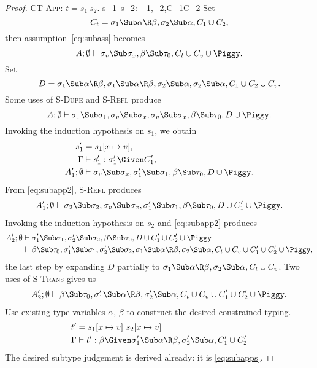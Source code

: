\documentclass{amsart}
\theoremstyle{definition}
\begin{document}
\begin{proof}
\Case\textsc{CT-App}: $t=s_1~s_2$.
{\Gamma\vdash s_1~s_2:\beta\Given
\sigma_1\Sub\alpha\R\beta,\sigma_2\Sub\alpha,C_1\cup C_2
}
Set
\[
C_t=\sigma_1\Sub\alpha\R\beta,\sigma_2\Sub\alpha,C_1\cup C_2,
\]
then assumption~\eqref{eq:subass} becomes
\[
A;\emptyset\vdash
  \sigma_v\Sub\sigma_x,
  \beta\Sub\tau_0,
  C_t\cup C_v\cup\Piggy.
\]
Set
\[
D=
\sigma_1\Sub\alpha\R\beta,
\sigma_1\Sub\alpha\R\beta,
\sigma_2\Sub\alpha,
\sigma_2\Sub\alpha,C_1\cup C_2\cup C_v.
\]
Some uses of \textsc{S-Dupe} and \textsc{S-Refl} produce
\[
A;\emptyset\vdash
  \sigma_1\Sub\sigma_1,
  \sigma_v\Sub\sigma_x,\sigma_v\Sub\sigma_x,
  \beta\Sub\tau_0,
  D\cup\Piggy.
\]
Invoking the induction hypothesis on $s_1$, we obtain
\begin{align}
s_1'&=s_1[x\mapsto v]\notag,
\\
\Gamma&\vdash s_1' : \sigma_1' \Given C_1',
\label{eq:subapp1}
\\
A_1';\emptyset&\vdash
  \sigma_v\Sub\sigma_x,
  \sigma_1'\Sub\sigma_1,
  \beta\Sub\tau_0,
  D\cup\Piggy.
\label{eq:subapp2}
\end{align}
From \eqref{eq:subapp2}, \textsc{S-Refl} produces
\begin{align}
A_1';\emptyset\vdash
  \sigma_2\Sub\sigma_2,
  \sigma_v\Sub\sigma_x,
  \sigma_1'\Sub\sigma_1,
  \beta\Sub\tau_0,
  D\cup C_1'\cup\Piggy.
\label{eq:subappf}
\end{align}
Invoking the induction hypothesis on $s_2$ and \eqref{eq:subapp2}
produces
\begin{align}
A_2';\emptyset&\vdash
  \sigma_1'\Sub\sigma_1,
  \sigma_2'\Sub\sigma_2,
  \beta\Sub\tau_0,
  D\cup C_1'\cup C_2'\cup\Piggy
\notag\\
&\vdash
  \beta\Sub\tau_0,
  \sigma_1'\Sub\sigma_1,
  \sigma_2'\Sub\sigma_2,
  \sigma_1\Sub\alpha\R\beta,\sigma_2\Sub\alpha,
  C_t\cup C_v\cup C_1'\cup C_2'\cup\Piggy,
\notag
\end{align}
the last step by expanding $D$ partially to
$\sigma_1\Sub\alpha\R\beta,\sigma_2\Sub\alpha,C_t\cup C_v$.
Two uses of \textsc{S-Trans} gives us
\begin{align}
A_2';\emptyset\vdash
  \beta\Sub\tau_0,
  \sigma_1'\Sub\alpha\R\beta,\sigma_2'\Sub\alpha,
  C_t\cup C_v\cup C_1'\cup C_2'\cup\Piggy.
\label{eq:subapps}
\end{align}
Use existing type variables $\alpha$, $\beta$ to construct the
desired constrained typing.
\begin{align}
t'&=s_1[x\mapsto v]~s_2[x\mapsto v]
\notag\\
\Gamma&\vdash t':
\beta\Given
\sigma_1'\Sub\alpha\R\beta,\sigma_2'\Sub\alpha,
C_1'\cup C_2'
\notag
\end{align}
The desired subtype judgement is derived already: it is
\eqref{eq:subapps}.


\end{proof}
\end{document}
